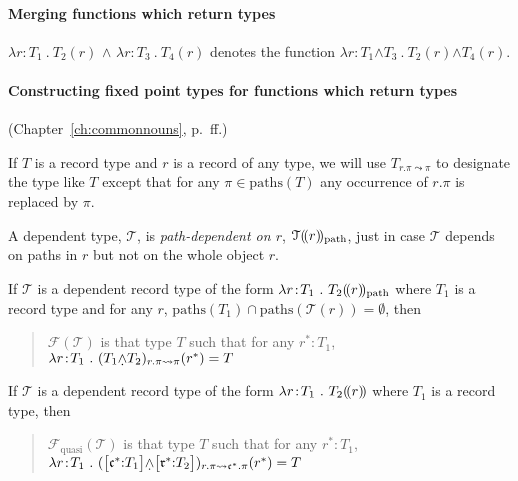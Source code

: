 \paragraph{Merging functions which return types}

$\lambda r\!:\!T_1\ .\ T_2(r)$ \d{\d{$\wedge$}} $\lambda r\!:\!T_3\ .\ T_4(r)$
denotes the function $\lambda r\!:\!T_1$\d{$\wedge$}$T_3\ .\
T_2(r)$\d{$\wedge$}$T_4(r)$.

\paragraph{Constructing fixed point types for functions which return
  types} (Chapter~\ref{ch:commonnouns}, p.~\pageref{pg:fixedpointtype-discussion}ff.)
\label{pg:fixedpointtype}



If $T$ is a
  record type and $r$ is a record of any type, we will use
  $T_{r.\pi\leadsto\pi}$ to designate the type like $T$ except that
  for any $\pi\in\mathrm{paths}(T)$ any occurrence of $r.\pi$ is
  replaced by $\pi$.

A dependent type, $\mathcal{T}$, is \textit{path-dependent on $r$},
$\mathcal{T}(\!(r)\!)_{\text{path}}$, just in case $\mathcal{T}$ depends
on paths in $r$ but not on the whole object $r$. 

  If $\mathcal{T}$ is a dependent record type of the form $\lambda
r\!:\!T_1\ .\ T_2(\!(r)\!)_{\text{path}}$ where $T_1$ is a record type and for any
$r$,
$\mathrm{paths}(T_1)\cap\mathrm{paths}(\mathcal{T}(r))=\emptyset$,
then
\begin{quote}
  $\mathcal{F}(\mathcal{T})$ is that type $T$ such that for any
  $r^*:T_1$, $\lambda r\!:\!T_1\ .\
  (T_1\text{\d{$\wedge$}}T_2)_{r.\pi\leadsto\pi}(r^*)=T$
\end{quote}

If $\mathcal{T}$ is a dependent record type of the form $\lambda
r\!:\!T_1\ .\ T_2(\!(r)\!)$ where $T_1$ is a record type,
then
\begin{quote}
  $\mathcal{F}_{\text{quasi}}(\mathcal{T})$ is that type $T$ such that for any
  $r^*:T_1$, $\lambda r\!:\!T_1\ .\
  (\text{\smallrecord{\smalltfield{$\mathfrak{c}^*$}{$T_1$}}\d{$\wedge$}\smallrecord{
      \smalltfield{$\mathfrak{r}^*$}{$T_2$}}})_{r.\pi\leadsto\mathfrak{c}^*.\pi}(r^*)=T$
\end{quote}

